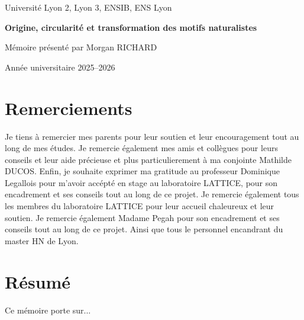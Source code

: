 \documentclass[12pt,a4paper,oneside]{report}
\begin{document}

\begin{titlepage}
    \centering
    {\Large Université Lyon 2, Lyon 3, ENSIB, ENS Lyon\par}
    \vspace{2cm}
    {\Huge\bfseries Origine, circularité et transformation des motifs naturalistes\par}
    \vspace{2cm}
    {\Large Mémoire présenté par Morgan RICHARD\par}
    \vfill
    {\large Année universitaire 2025--2026\par}
\end{titlepage}

\chapter*{Remerciements}

Je tiens à remercier mes parents pour leur soutien et leur encouragement tout au long de mes études. Je remercie également mes amis et collègues pour leurs conseils et leur aide précieuse et plus particulierement à ma conjointe Mathilde DUCOS. Enfin, je souhaite exprimer ma gratitude au professeur Dominique Legallois pour m'avoir accépté en stage au laboratoire LATTICE, pour son encadrement et ses conseils tout au long de ce projet. Je remercie également tous les membres du laboratoire LATTICE pour leur accueil chaleureux et leur soutien.
Je remercie également Madame Pegah pour son encadrement et ses conseils tout au long de ce projet. Ainsi que tous le personnel encandrant du master HN de Lyon.   

\chapter*{Résumé}

Ce mémoire porte sur...

\tableofcontents
\listoffigures
\listoftables

\clearpage
{}





\nocite{*}
\printbibliography[heading=bibintoc] 


\appendix

\end{document}
